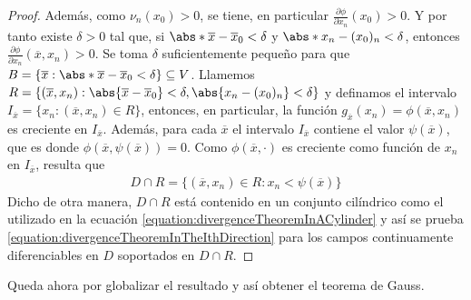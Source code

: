 \documentclass{report}
\theoremstyle{definition}
\theoremstyle{remark}
\begin{document}
\begin{proof}
    Además, como \(\nu_n(x_0) > 0\), se tiene, en particular \(\frac{\partial \phi}{\partial x_n}(x_0) > 0\).
    Y por tanto existe \(\delta > 0\) tal que, si \(\abs*{\overline{x} - \overline{x}_0} < \delta\) y \(\abs*{x_n - (x_0)_n} < \delta\),
    entonces \(\frac{\partial \phi}{\partial x_n}(\overline{x}, x_n) > 0\).
    Se toma \(\delta\) suficientemente pequeño para que \(B = \{\overline{x} : \abs*{\overline{x} - \overline{x}_0} < \delta\} \subseteq V\).
    Llamemos \(R = \{
      (\overline{x}, x_n) :
      \abs{\overline{x} - \overline{x}_0} < \delta,
      \abs{x_n - (x_0)_n} < \delta
    \}\)
    y definamos el intervalo \(I_{\overline{x}} = \{x_n : (\overline{x}, x_n) \in R\}\), entonces, en particular, la función \(g_{\overline{x}}(x_n) = \phi(\overline{x}, x_n)\) es creciente en \(I_{\overline{x}}\).
    Además, para cada \(\overline{x}\) el intervalo \(I_{\overline{x}}\) 
    contiene el valor \(\psi(\overline{x})\), que es donde \(\phi(\overline{x}, \psi(\overline{x})) = 0\).
    Como \(\phi(\overline{x}, \cdot)\) es creciente como función de \(x_n\) en \(I_{\overline{x}}\), resulta que
    \begin{align}
      D \cap R
      =
      \{(\overline{x}, x_n) \in R : x_n < \psi(\overline{x})\}
    \end{align}
    Dicho de otra manera, \(D \cap R\) está contenido en un conjunto cilíndrico como el utilizado en la ecuación \eqref{equation:divergenceTheoremInACylinder} y así se prueba \eqref{equation:divergenceTheoremInTheIthDirection} para los campos continuamente diferenciables en \(D\) soportados en \(D \cap R\).
  \end{proof}


  \newpage
  Queda ahora por globalizar el resultado y así obtener el teorema de Gauss.
\end{document}
